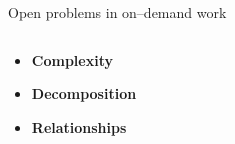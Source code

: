 \documentclass[presentation]{subfiles}
\begin{document}
\begin{frame}{Open problems in on--demand work}
\begin{columns}
\begin{column}[T]{0.5\textwidth}
  \begin{itemize}%
    \item<2,4> \textbf{\large Complexity}\\
    \scriptsize{
    \textcite{suzukiAtelier,KimStoria,yuanAlmost,Yu2016b,Nebeling:2016:WCW:2858036.2858169,Hahn:2016:KAB:2858036.2858364}
    }
    \vspace{8mm}
    
    \item<3> \textbf{\large Decomposition}\\
    \scriptsize{
    \textcite{sensitiveTasks,LykourentzouPersonalityMatters,Law:2016:CKC:2858036.2858144,Chang:2016:ACC:2858036.2858411,Newell:2016:OMA:2858036.2858490}
    }
    \vspace{8mm}

    \item<5> \textbf{\large Relationships}\\
    \scriptsize{
      \textcite{turkopticon,storiesIraniSilberman,crowdcollab,takingAHITMcInnis,dynamo,uberAlgorithm}
    }

  \end{itemize}
\end{column}

\begin{column}[T]{0.25\textwidth}
  \begin{figure}
    \centering
    \vspace{-5mm}


\end{figure}
\end{column}
\end{columns}
\end{frame}
\end{document}
